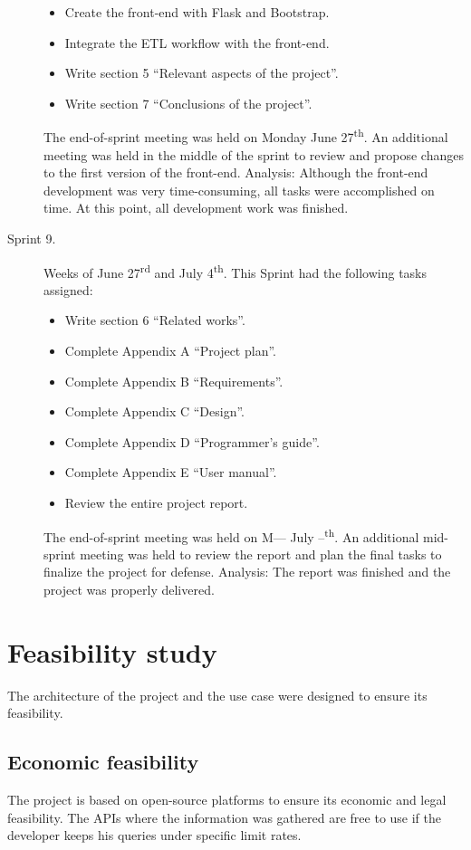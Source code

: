 \begin{description}
\begin{itemize}
		\item Create the front-end with Flask and Bootstrap.
		\item Integrate the ETL workflow with the front-end.
		\item Write section 5 ``Relevant aspects of the project''.
		\item Write section 7 ``Conclusions of the project''.
	\end{itemize}
	The end-of-sprint meeting was held on Monday June 27\textsuperscript{th}. An additional meeting was held in the middle of the sprint to review and propose changes to the first version of the front-end. Analysis: Although the front-end development was very time-consuming, all tasks were accomplished on time. At this point, all development work was finished.
	\item[Sprint 9.] Weeks of June 27\textsuperscript{rd} and July 4\textsuperscript{th}. This Sprint had the following tasks assigned:
	\begin{itemize}
		\item Write section 6 ``Related works''.
		\item Complete Appendix A ``Project plan''.
		\item Complete Appendix B ``Requirements''.
		\item Complete Appendix C ``Design''.
		\item Complete Appendix D ``Programmer's guide''.
		\item Complete Appendix E ``User manual''.
		\item Review the entire project report.
	\end{itemize}
	The end-of-sprint meeting was held on M--- July --\textsuperscript{th}. An additional mid-sprint meeting was held to review the report and plan the final tasks to finalize the project for defense. Analysis: The report was finished and the project was properly delivered.
\end{description}

\section{Feasibility study}
\nonzeroparskip The architecture of the project and the use case were designed to ensure its feasibility.

\subsection{Economic feasibility}
\nonzeroparskip The project is based on open-source platforms to ensure its economic and legal feasibility. The APIs where the information was gathered are free to use if the developer keeps his queries under specific limit rates.

